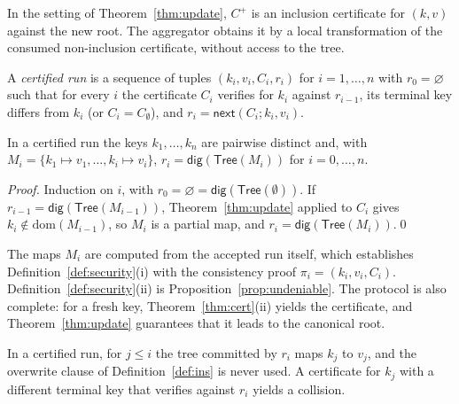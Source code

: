 \documentclass[runningheads]{llncs}
\newcommand{\dig}{\mathsf{dig}}
\newcommand{\Tree}{\mathsf{Tree}}
\newcommand{\nxt}{\mathsf{next}}
\newcommand{\dom}{\mathrm{dom}}
\begin{document}
\begin{corollary}\label{cor:derived}
In the setting of Theorem~\ref{thm:update}, $C^{+}$ is an inclusion certificate for $(k,v)$ against the new root. The aggregator obtains it by a local transformation of the consumed non-inclusion certificate, without access to the tree.
\end{corollary}

\begin{definition}\label{def:run}
A \emph{certified run} is a sequence of tuples $(k_i,v_i,C_i,r_i)$ for $i = 1,\ldots,n$ with $r_0 = \varnothing$
such that for every $i$ the certificate $C_i$ verifies for $k_i$ against $r_{i-1}$,
its terminal key differs from $k_i$ (or $C_i = C_\emptyset$),
and $r_i = \nxt(C_i;k_i,v_i)$.
\end{definition}

\begin{theorem}\label{thm:run}
In a certified run the keys $k_1,\ldots,k_n$ are pairwise distinct and, with $M_i = \{k_1 \mapsto v_1,\ldots,k_i \mapsto v_i\}$, $r_i = \dig(\Tree(M_i))$ for $i = 0,\ldots,n$.
\end{theorem}
\begin{proof}
Induction on $i$, with $r_0 = \varnothing = \dig(\Tree(\emptyset))$. If $r_{i-1} = \dig(\Tree(M_{i-1}))$, Theorem~\ref{thm:update} applied to $C_i$ gives $k_i \notin \dom(M_{i-1})$, so $M_i$ is a partial map, and $r_i = \dig(\Tree(M_i))$.\qed
\end{proof}

The maps $M_i$ are computed from the accepted run itself, which establishes Definition~\ref{def:security}(i) with the consistency proof $\pi_i = (k_i,v_i,C_i)$. Definition~\ref{def:security}(ii) is Proposition~\ref{prop:undeniable}. The protocol is also complete: for a fresh key, Theorem~\ref{thm:cert}(ii) yields the certificate, and Theorem~\ref{thm:update} guarantees that it leads to the canonical root.

\begin{corollary}\label{cor:run}
In a certified run, for $j \le i$ the tree committed by $r_i$ maps $k_j$ to $v_j$, and the overwrite clause of Definition~\ref{def:ins} is never used. A certificate for $k_j$ with a different terminal key that verifies against $r_i$ yields a collision.
\end{corollary}
\end{document}
